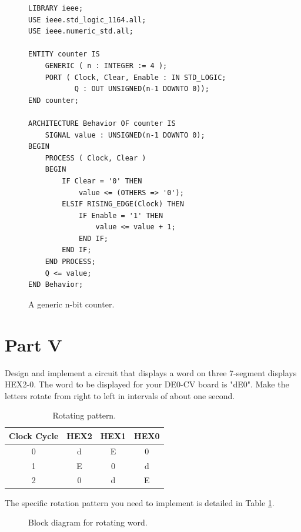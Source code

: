 \documentclass{article}
\begin{document}
\begin{figure}[H]
    \centering
    \begin{verbatim}
LIBRARY ieee;
USE ieee.std_logic_1164.all;
USE ieee.numeric_std.all;

ENTITY counter IS
    GENERIC ( n : INTEGER := 4 );
    PORT ( Clock, Clear, Enable : IN STD_LOGIC;
           Q : OUT UNSIGNED(n-1 DOWNTO 0));
END counter;

ARCHITECTURE Behavior OF counter IS
    SIGNAL value : UNSIGNED(n-1 DOWNTO 0);
BEGIN
    PROCESS ( Clock, Clear )
    BEGIN
        IF Clear = '0' THEN
            value <= (OTHERS => '0');
        ELSIF RISING_EDGE(Clock) THEN
            IF Enable = '1' THEN
                value <= value + 1;
            END IF;
        END IF;
    END PROCESS;
    Q <= value;
END Behavior;
    \end{verbatim}
    \caption{A generic n-bit counter.}
    \label{fig:generic_counter}
\end{figure}

\section*{Part V}

Design and implement a circuit that displays a word on three 7-segment displays HEX2-0. The word to be displayed for your DE0-CV board is "dE0". Make the letters rotate from right to left in intervals of about one second.

\begin{table}[H]
    \centering
    \begin{tabular}{|c|c|c|c|}
    \hline
    Clock Cycle & HEX2 & HEX1 & HEX0 \\
    \hline
    0 & d & E & 0 \\
    1 & E & 0 & d \\
    2 & 0 & d & E \\
    \hline
    \end{tabular}
    \caption{Rotating pattern.}
    \label{tab:rotate_pattern}
\end{table}

The specific rotation pattern you need to implement is detailed in Table \ref{tab:rotate_pattern}.

\begin{figure}[H]
    \centering
    
    \caption{Block diagram for rotating word.}
    \label{fig:rotate_small}
\end{figure}
\end{document}
